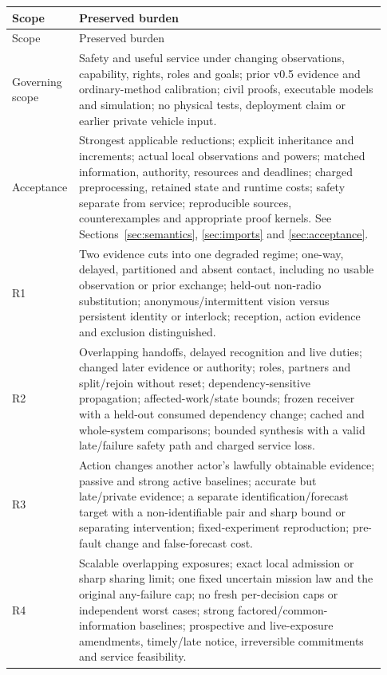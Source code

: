 \documentclass[11pt]{article}
\begin{document}
{\small
\renewcommand{\arraystretch}{1.15}
\begin{longtable}{@{}P{0.12\linewidth}P{0.81\linewidth}@{}}
\toprule
Scope & Preserved burden \\
\midrule
\endfirsthead
\toprule
Scope & Preserved burden \\
\midrule
\endhead
Governing scope & Safety and useful service under changing observations, capability, rights, roles and goals; prior v0.5 evidence and ordinary-method calibration; civil proofs, executable models and simulation; no physical tests, deployment claim or earlier private vehicle input. \\
Acceptance & Strongest applicable reductions; explicit inheritance and increments; actual local observations and powers; matched information, authority, resources and deadlines; charged preprocessing, retained state and runtime costs; safety separate from service; reproducible sources, counterexamples and appropriate proof kernels. See Sections~\ref{sec:semantics}, \ref{sec:imports} and \ref{sec:acceptance}. \\
R1 & Two evidence cuts into one degraded regime; one-way, delayed, partitioned and absent contact, including no usable observation or prior exchange; held-out non-radio substitution; anonymous/intermittent vision versus persistent identity or interlock; reception, action evidence and exclusion distinguished. \\
R2 & Overlapping handoffs, delayed recognition and live duties; changed later evidence or authority; roles, partners and split/rejoin without reset; dependency-sensitive propagation; affected-work/state bounds; frozen receiver with a held-out consumed dependency change; cached and whole-system comparisons; bounded synthesis with a valid late/failure safety path and charged service loss. \\
R3 & Action changes another actor's lawfully obtainable evidence; passive and strong active baselines; accurate but late/private evidence; a separate identification/forecast target with a non-identifiable pair and sharp bound or separating intervention; fixed-experiment reproduction; pre-fault change and false-forecast cost. \\
R4 & Scalable overlapping exposures; exact local admission or sharp sharing limit; one fixed uncertain mission law and the original any-failure cap; no fresh per-decision caps or independent worst cases; strong factored/common-information baselines; prospective and live-exposure amendments, timely/late notice, irreversible commitments and service feasibility. \\

\end{longtable}}
\end{document}
